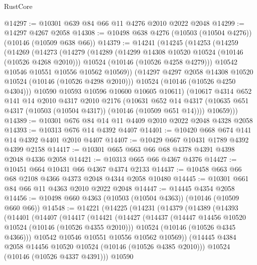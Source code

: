 \begin{lexlean}{RustCore}
\begin{coremodule}
@14297 := @10301 @639 @84 @66 @11 @4276 @2010 @2022 @2048
@14299 := @14297 @4267 @2058
@14308 := @10498 @638 @4276 (@10503 (@10504 @4276)) (@10146 (@10509 @638 @66))
@14379 := @14241
    (@14245
      (@14253
        (@14259
          (@14269
            (@14273
              (@14279
                (@14289
                  (@14299 @14308 @10520 @10524 (@10146 (@10526 @4268 @2010)))
                  @10524
                  (@10146 (@10526 @4258 @4279)))
                @10542
                @10546
                @10551
                @10556
                @10562
                @10569))
            (@14297 @4297 @2058 @14308 @10520 @10524 (@10146 (@10526 @4298 @2010)))
            @10524
            (@10146 (@10526 @4250 @4304)))
          @10590
          @10593
          @10596
          @10600
          @10605
          @10611)
        (@10617
          @4314
          @652
          @141
          @14
          @2010
          @4317
          @2010
          @2176
          (@10631
            @652
            @14
            @4317
            (@10635 @651 @4317 (@10503 (@10504 @4317)) (@10146 (@10509 @651 @14))))
          @10659)))
@14389 := @10301 @676 @84 @14 @11 @4409 @2010 @2022 @2048 @4328 @2058
@14393 := @10313 @676 @14 @4392 @4407
@14401 := @10420 @668 @674 @141 @14 @4392 @4401 @2010 @4407
@14407 := @10429 @667 @10431 @1789 @4392 @4399 @2158
@14417 := @10301 @665 @663 @66 @68 @4378 @4391 @4398 @2048 @4336 @2058
@14421 := @10313 @665 @66 @4367 @4376
@14427 := @10451 @664 @10431 @66 @4367 @4374 @2133
@14437 := @10458 @663 @66 @68 @2108 @4366 @4373 @2048 @4344 @2058 @10480
@14445 := @10301 @661 @84 @66 @11 @4363 @2010 @2022 @2048
@14447 := @14445 @4354 @2058
@14456 := @10498 @660 @4363 (@10503 (@10504 @4363)) (@10146 (@10509 @660 @66))
@14548 := @14221
    (@14225
      (@14231
        (@14379
          (@14389
            (@14393
              (@14401
                (@14407
                  (@14417
                    (@14421
                      (@14427
                        (@14437
                          (@14447 @14456 @10520 @10524 (@10146 (@10526 @4355 @2010)))
                          @10524
                          (@10146 (@10526 @4345 @4366)))
                        @10542
                        @10546
                        @10551
                        @10556
                        @10562
                        @10569))
                    (@14445 @4384 @2058 @14456 @10520 @10524 (@10146 (@10526 @4385 @2010)))
                    @10524
                    (@10146 (@10526 @4337 @4391)))
                  @10590

\end{coremodule}
\end{lexlean}
